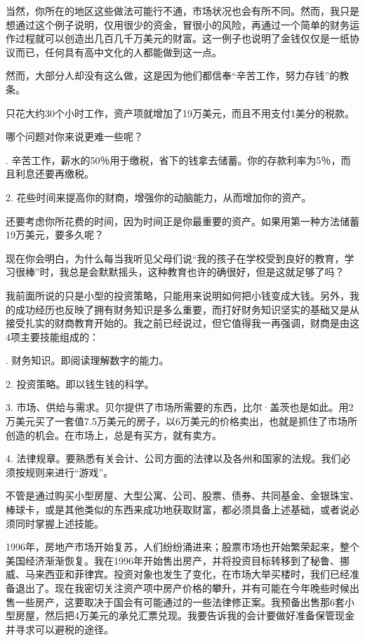 当然，你所在的地区这些做法可能行不通，市场状况也会有所不同。然而，我只是想通过这个例子说明，仅用很少的资金，冒很小的风险，再通过一个简单的财务运作过程就可以创造出几百几千万美元的财富。这一例子也说明了金钱仅仅是一纸协议而已，任何具有高中文化的人都能做到这一点。

然而，大部分人却没有这么做，这是因为他们都信奉“辛苦工作，努力存钱”的教条。

只花大约30个小时工作，资产项就增加了19万美元，而且不用支付1美分的税款。

哪个问题对你来说更难一些呢？

{. 辛苦工作，薪水的50％用于缴税，省下的钱拿去储蓄。你的存款利率为5％，而且利息还要再缴税。

2. 花些时间来提高你的财商，增强你的动脑能力，从而增加你的资产。}

还要考虑你所花费的时间，因为时间正是你最重要的资产。如果用第一种方法储蓄19万美元，要多久呢？

现在你会明白，为什么每当我听见父母们说“我的孩子在学校受到良好的教育，学习很棒”时，我总是会默默摇头，这种教育也许的确很好，但是这就足够了吗？

我前面所说的只是小型的投资策略，只能用来说明如何把小钱变成大钱。另外，我的成功经历也反映了拥有财务知识是多么重要，而打好财务知识坚实的基础又是从接受扎实的财商教育开始的。我之前已经说过，但它值得我一再强调，财商是由这4项主要技能组成的：

{. 财务知识。即阅读理解数字的能力。

2. 投资策略。即以钱生钱的科学。

3. 市场、供给与需求。贝尔提供了市场所需要的东西，比尔·盖茨也是如此。用2万美元买了一套值7.5万美元的房子，以6万美元的价格卖出，也就是抓住了市场所创造的机会。在市场上，总是有买方，就有卖方。

4. 法律规章。要熟悉有关会计、公司方面的法律以及各州和国家的法规。我们必须按规则来进行“游戏”。}

不管是通过购买小型房屋、大型公寓、公司、股票、债券、共同基金、金银珠宝、棒球卡，或是其他类似的东西来成功地获取财富，都必须具备上述基础，或者说必须同时掌握上述技能。

1996年，房地产市场开始复苏，人们纷纷涌进来；股票市场也开始繁荣起来，整个美国经济渐渐恢复。我在1996年开始售出房产，并将投资目标转移到了秘鲁、挪威、马来西亚和菲律宾。投资对象也发生了变化，在市场大举买楼时，我们已经准备退出了。现在我密切关注资产项中房产价格的攀升，并有可能在今年晚些时候出售一些房产，这要取决于国会有可能通过的一些法律修正案。我预备出售那6套小型房屋，然后把4万美元的承兑汇票兑现。我要告诉我的会计要做好准备保管现金并寻求可以避税的途径。

